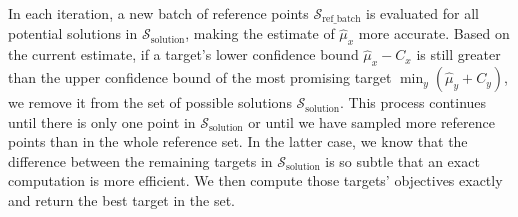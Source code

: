 In each iteration, a new batch of reference points $\mathcal{S}_{\text{ref\_batch}}$ is evaluated for all potential solutions in $\mathcal{S}_{\text{solution}}$, making the estimate of $\hat{\mu}_x$ more accurate. 
Based on the current estimate, if a target's lower confidence bound $\hat{\mu}_x - C_x$ is still greater than the upper confidence bound of the most promising target $\min_{y}(\hat{\mu}_{y} + C_{y})$, we remove it from the set of possible solutions $\mathcal{S}_{\text{solution}}$. This process continues until there is only one point in $\mathcal{S}_{\text{solution}}$ or until we have sampled more reference points than in the whole reference set. In the latter case, we know that the difference between the remaining targets in $\mathcal{S}_{\text{solution}}$ is so subtle that an exact computation is more efficient. We then compute those targets' objectives exactly and return the best target in the set. 


